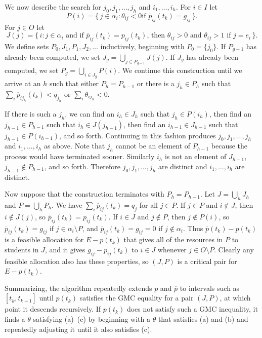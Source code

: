 \documentclass[12pt]{article}
\theoremstyle{definition}
\newcommand{\barp}{\overline{p}}
\begin{document}
\begin{appendix}
We now describe the search for $j_0,j_1, \ldots, j_h$ and $i_1,
\ldots, i_h$. For $i \in I$ let
$$P(i) = \{\, j \in \alpha_i : \text{$\theta_{ij} < 0$
  if $\barp_{ij}(t_k) = g_{ij}$} \,\}.$$
For $j \in O$ let
$$J(j) = \{\, i : \text{$j \in \alpha_i$ and if
  $\barp_{ij}(t_k) = p_{ij}(t_k)$, then $\theta_{ij} > 0$ and
  $\theta_{ij} > 1$ if $j = e_i$} \,\}.$$ We define sets $P_0,
J_1, P_1, J_2, \ldots$ inductively, beginning with $P_0 = \{j_0\}$.
If $P_{g-1}$ has already been computed, we set $J_g = \bigcup_{j \in
  P_{g-1}} J(j)$. If $J_g$ has already been computed,
we set $P_g = \bigcup_{i \in J_g} P(i)$.  We continue
this construction until we arrive at an $h$ such that either $P_h =
P_{h-1}$ or there is a $j_h \in P_h$ such that $\sum_i
\barp_{ij_h}(t_k) < q_{j_h}$ or $\sum_i \theta_{ij_h} < 0$.

If there is such a $j_h$, we can find an $i_h \in J_h$ such that $j_h
\in P(i_h)$, then find an $j_{h-1} \in P_{h-1}$ such
that $i_h \in J(j_{h-1})$, then find an $i_{h-1} \in
J_{h-1}$ such that $j_{h-1} \in P(i_{h-1})$, and so
forth.  Continuing in this fashion produces $j_0,j_1, \ldots, j_h$ and
$i_1, \ldots, i_h$ as above.  Note that $j_h$ cannot be an element of
$P_{h-1}$ because the process would have terminated sooner.  Similarly
$i_h$ is not an element of $J_{h-1}$, $j_{h-1} \notin P_{h-1}$, and so
forth.  Therefore $j_0,j_1, \ldots, j_h$ are distinct and $i_1,
\ldots, i_h$ are distinct.

Now suppose that the construction terminates with $P_h = P_{h-1}$.
Let $J = \bigcup_h J_h$ and $P = \bigcup_h P_h$.  We have $\sum_i
\barp_{ij}(t_k) = q_j$ for all $j \in P$.  If $j \in P$ and $i \notin
J$, then $i \notin J(j)$, so $\barp_{ij}(t_k) = p_{ij}(t_k)$.  If $i
\in J$ and $j \notin P$, then $j \notin P(i)$, so $\barp_{ij}(t_k) =
g_{ij}$ if $j \in \alpha_i \setminus P$, and $\barp_{ij}(t_k) = g_{ij}
= 0$ if $j \notin \alpha_i$. Thus $\barp(t_k) - p(t_k)$ is a feasible
allocation for $E - p(t_k)$ that gives all of the resources in $P$ to
students in $J$, and it gives $g_{ij} - p_{ij}(t_k)$ to $i \in J$
whenever $j \in O \setminus P$. Clearly any feasible allocation also
has these properties, so $(J,P)$ is a critical pair for $E - p(t_k)$.

Summarizing, the algorithm repeatedly extends $p$ and $\barp$ to
intervals such as $[t_k,t_{k+1}]$ until $p(t_k)$ satisfies the GMC
equality for a pair $(J,P)$, at which point it descends
recursively. If $p(t_k)$ does not satisfy such a GMC inequality, it
finds a $\theta$ satisfying (a)--(c) by beginning with a $\theta$ that
satisfies (a) and (b) and repeatedly adjusting it until it also
satisfies (c).


\end{appendix}
\end{document}

